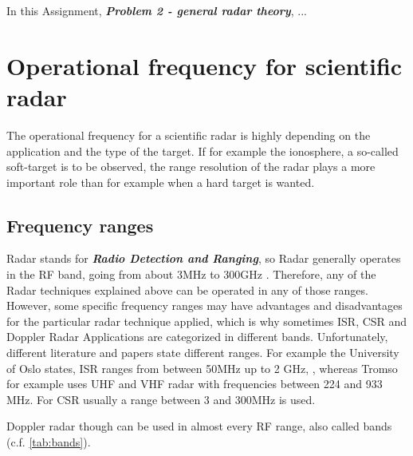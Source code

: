 

In this Assignment, \textit{\textbf{Problem 2 - general radar theory}}, ...


\section{Operational frequency for scientific radar}
The operational frequency for a scientific radar is highly depending on the application and the type of the target. If for example the ionosphere, a so-called soft-target is to be observed, the range resolution of the radar plays a more important role than for example when a hard target is wanted. 


\subsection{Frequency ranges}
Radar stands for \textit{\textbf{Radio Detection and Ranging}}, so Radar generally operates in the RF band, going from about 3MHz to 300GHz \citep{richards2010principles}. Therefore, any of the Radar techniques explained above can be operated in any of those ranges. However, some specific frequency ranges may have advantages and disadvantages for the particular radar technique applied, which is why sometimes ISR, CSR and Doppler Radar Applications are categorized in different bands. Unfortunately, different literature and papers state different ranges. For example the University of Oslo states, ISR ranges from between 50MHz up to 2 GHz, \citep{oslo:lecture}, whereas Tromso for example uses UHF and VHF radar with frequencies between 224 and 933 MHz. For CSR usually a range between 3 and 300MHz is used.

Doppler radar though can be used in almost every RF range, also called bands (c.f. \ref{tab:bands}).

